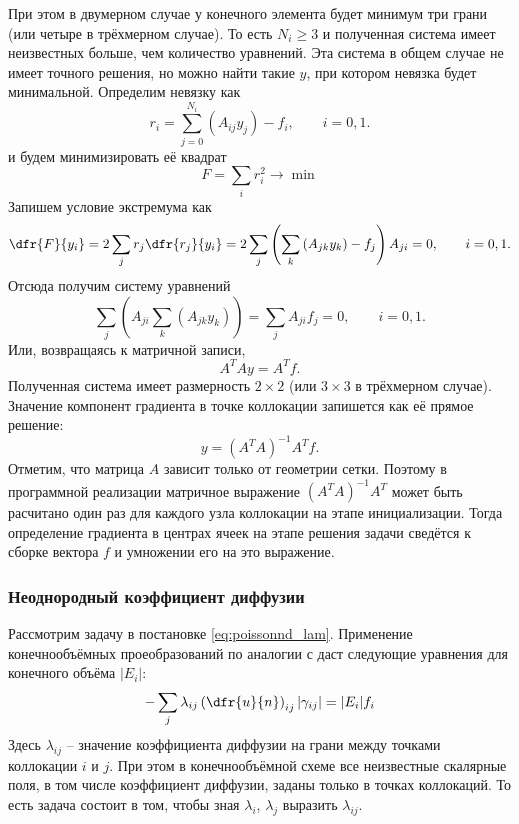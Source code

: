 При этом в двумерном случае у конечного элемента будет минимум три грани (или четыре в трёхмерном случае). То есть $N_i \geq 3$ 
и полученная система имеет неизвестных больше, чем количество уравнений.
Эта система в общем случае не имеет точного решения,
но можно найти такие $y$, при котором невязка будет минимальной.
Определим невязку как 
$$
r_i = \sum_{j=0}^{N_i}\left(A_{ij}y_j\right) - f_i, \qquad i=0, 1.
$$
и будем минимизировать её квадрат
$$
F = \sum_i r_i^2 \to \min
$$
Запишем условие экстремума как
$$
\dfr{F}{y_i} = 2 \sum_j r_j \dfr{r_j}{y_i} =
               2 \sum_j \left( \sum_k \left( A_{jk} y_k\right) - f_j \right)A_{ji} = 0, \qquad i=0,1.
$$
Отсюда получим систему уравнений
$$
\sum_j \left( A_{ji} \sum_k \left( A_{jk} y_k\right) \right) = \sum_j A_{ji}f_j = 0, \qquad i=0,1.
$$
Или, возвращаясь к матричной записи,
$$
A^{T} A y = A^{T}f.
$$
Полученная система имеет размерность $2\times2$ (или $3\times3$ в трёхмерном случае).
Значение компонент градиента в точке коллокации запишется как её прямое решение:
$$
y = \left(A^T A\right)^{-1} A^T f.
$$
Отметим, что матрица $A$ зависит только от геометрии сетки.
Поэтому в программной реализации матричное выражение $\left(A^T A\right)^{-1} A^T $ может быть расчитано 
один раз для каждого узла коллокации на этапе инициализации.
Тогда определение градиента в центрах ячеек на этапе решения задачи 
сведётся к сборке вектора $f$ и умножении его на это выражение.

\subsubsection{Неоднородный коэффициент диффузии}
\label{sec:fvm_nonconst_lambda}
Рассмотрим задачу в постановке \cref{eq:poissonnd_lam}.
Применение конечнообъёмных проеобразований по аналогии с 
 даст следующие уравнения для конечного объёма $|E_i|$:
\begin{equation}
\label{eq:fvm_lambda_ij_scheme}
-\sum_j \lambda_{ij} \left(\dfr{u}{n}\right)_{ij} |\gamma_{ij}| = |E_i| f_i
\end{equation}
Здесь $\lambda_{ij}$ -- значение коэффициента диффузии
на грани между точками коллокации $i$ и $j$.
При этом в конечнообъёмной схеме все неизвестные скалярные поля, в том числе коэффициент диффузии, заданы только
в точках коллокаций. То есть задача состоит в том, чтобы зная $\lambda_i$, $\lambda_j$ выразить $\lambda_{ij}$.

